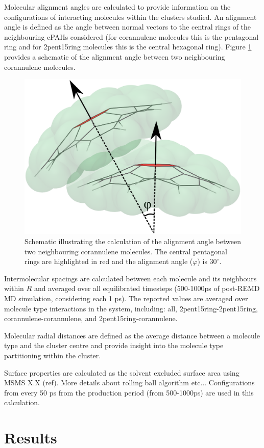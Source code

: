 Molecular alignment angles are calculated to provide information on the configurations of interacting molecules within the clusters studied.  An alignment angle is defined as the angle between normal vectors to the central rings of the neighbouring cPAHs considered (for corannulene molecules this is the pentagonal ring and for 2pent15ring molecules this is the central hexagonal ring).  Figure \ref{fig:alignmentangle_schematic} provides a schematic of the alignment angle between two neighbouring corannulene molecules.
%
\begin{figure}[!tbh]
\centering
\includegraphics[width=0.25\linewidth]{Figures/alignment_angle_schematic.eps}
\caption{Schematic illustrating the calculation of the alignment angle between two neighbouring corannulene molecules. The central pentagonal rings are highlighted in red and the alignment angle ($\varphi$) is $30^{\circ}$.}
\label{fig:alignmentangle_schematic}
\end{figure}
 
Intermolecular spacings are calculated between each molecule and its neighbours within $R$ and averaged over all equilibrated timesteps (500-1000ps of post-REMD MD simulation, considering each 1 ps).  The reported values are averaged over molecule type interactions in the system, including: all, 2pent15ring-2pent15ring, corannulene-corannulene, and 2pent15ring-corannulene.

Molecular radial distances are defined as the average distance between a molecule type and the cluster centre and provide insight into the molecule type partitioning within the cluster.

Surface properties are calculated as the solvent excluded surface area using MSMS X.X (ref). More details about rolling ball algorithm etc...
Configurations from every 50 ps from the production period (from 500-1000ps) are used in this calculation.


\section{Results}


